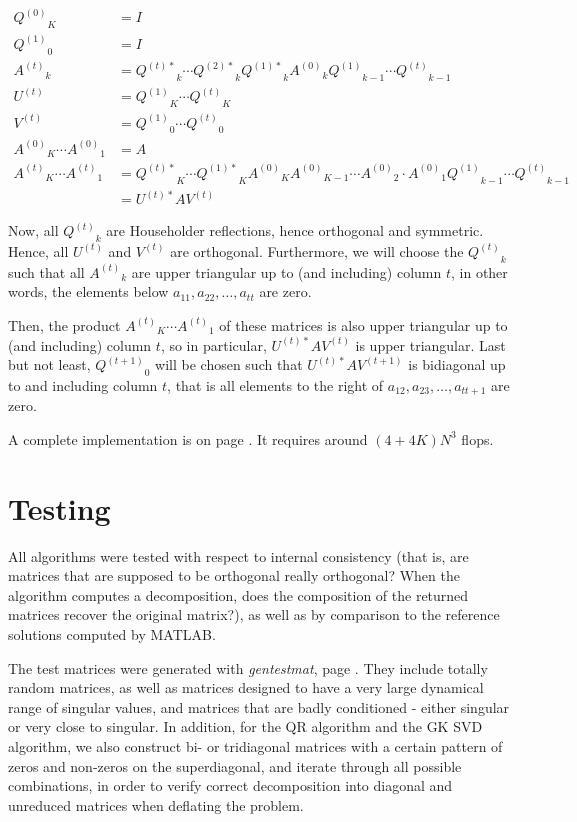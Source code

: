 \documentclass[11pt]{article}
\renewcommand{\j}[2]{\ensuremath{#1^{(#2)}}}	%
\newcommand{\jt}[2]{\ensuremath{#1^{(#2)*}}}	%
\begin{document}
\begin{align*}
	\j Q0_K 	&= I 	\\
	\j Q1_0 	&= I	\\
	\j At_k 	&= \jt Qt_k \cdots \jt Q2_k \jt Q1_k \j A0_k \j Q1_{k-1} \cdots \j Qt_{k-1} \\
	\j Ut		&= \j Q1_K \cdots \j Qt_K \\
	\j Vt		&= \j Q1_0 \cdots \j Qt_0 \\
	\j A0_K \cdots \j A0_1 &= A \\
	\j At_K \cdots \j At_1 &= \jt Qt_K \cdots \jt Q1_K \j A0_K\j A0_{K-1}\cdots\j A0_2\cdot \j A0_1 \j Q1_{k-1} \cdots \j Qt_{k-1} \\
					&= \jt Ut A \j Vt
\end{align*}

Now, all $\j Qt_k$ are Householder reflections, hence orthogonal and symmetric. Hence, all \j Ut and \j Vt are orthogonal. Furthermore, we will choose the $\j Qt_k$ such that all $\j At_k$ are upper triangular up to (and including) column $t$, in other words, the elements below $a_{11}, a_{22}, \ldots, a_{tt}$ are zero.

Then, the product $\j At_K \cdots \j At_1$ of these matrices is also upper triangular up to (and including) column $t$, so in particular, $\jt Ut A \j Vt$ is upper triangular. Last but not least, $\j Q{t+1}_0$ will be chosen such that $\jt Ut A \j V{t+1}$ is bidiagonal up to and including column $t$, that is all elements to the right of $a_{12}, a_{23}, \ldots, a_{tt+1}$ are zero.

A complete implementation is on page \pageref{rc:bidigprod}. It requires around $(4+4K) N^3$ flops.

\section{Testing}
All algorithms were tested with respect to internal consistency (that is, are matrices that are supposed to be orthogonal really orthogonal? When the algorithm computes a decomposition, does the composition of the returned matrices recover the original matrix?), as well as by comparison to the reference solutions computed by MATLAB. 

The test matrices were generated with \emph{gentestmat}, page \pageref{rc:gentestmat}. They include totally random matrices, as well as matrices designed to have a very large dynamical range of singular values, and matrices that are badly conditioned - either singular or very close to singular. In addition, for the QR algorithm and the GK SVD algorithm, we also construct bi- or tridiagonal matrices with a certain pattern of zeros and non-zeros on the superdiagonal, and iterate through all possible combinations, in order to verify correct decomposition into diagonal and unreduced matrices when deflating the problem.
\end{document}
